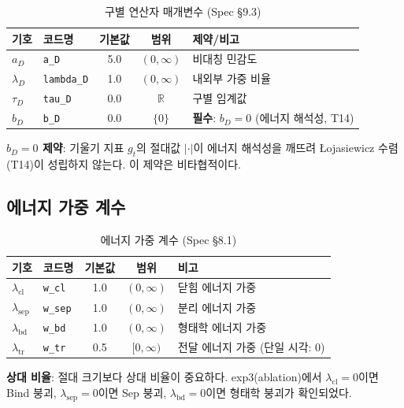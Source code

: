 \begin{table}[h]
\centering
\caption{구별 연산자 매개변수 (Spec \S9.3)}
\label{tab:distinction-params}
\begin{tabular}{llccp{5cm}}
\hline
\textbf{기호} & \textbf{코드명} & \textbf{기본값} & \textbf{범위} & \textbf{제약/비고} \\
\hline
$a_D$ & \texttt{a\_D} & 5.0 & $(0, \infty)$ & 비대칭 민감도 \\
$\lambda_D$ & \texttt{lambda\_D} & 1.0 & $(0, \infty)$ & 내외부 가중 비율 \\
$\tau_D$ & \texttt{tau\_D} & 0.0 & $\mathbb{R}$ & 구별 임계값 \\
$b_D$ & \texttt{b\_D} & 0.0 & $\{0\}$ & \textbf{필수}: $b_D = 0$ (에너지 해석성, T14) \\
\hline
\end{tabular}
\end{table}

\textbf{$b_D = 0$ 제약}: 기울기 지표 $g_t$의 절대값 $|\cdot|$이 에너지 해석성을 깨뜨려 Łojasiewicz 수렴(T14)이 성립하지 않는다. 이 제약은 비타협적이다.


\subsection{에너지 가중 계수}

\begin{table}[h]
\centering
\caption{에너지 가중 계수 (Spec \S8.1)}
\label{tab:energy-weights}
\begin{tabular}{llccp{5cm}}
\hline
\textbf{기호} & \textbf{코드명} & \textbf{기본값} & \textbf{범위} & \textbf{비고} \\
\hline
$\lambda_{\mathrm{cl}}$ & \texttt{w\_cl} & 1.0 & $(0, \infty)$ & 닫힘 에너지 가중 \\
$\lambda_{\mathrm{sep}}$ & \texttt{w\_sep} & 1.0 & $(0, \infty)$ & 분리 에너지 가중 \\
$\lambda_{\mathrm{bd}}$ & \texttt{w\_bd} & 1.0 & $(0, \infty)$ & 형태학 에너지 가중 \\
$\lambda_{\mathrm{tr}}$ & \texttt{w\_tr} & 0.5 & $[0, \infty)$ & 전달 에너지 가중 (단일 시각: 0) \\
\hline
\end{tabular}
\end{table}

\textbf{상대 비율}: 절대 크기보다 상대 비율이 중요하다. exp3(ablation)에서 $\lambda_{\mathrm{cl}} = 0$이면 Bind 붕괴, $\lambda_{\mathrm{sep}} = 0$이면 Sep 붕괴, $\lambda_{\mathrm{bd}} = 0$이면 형태학 붕괴가 확인되었다.


